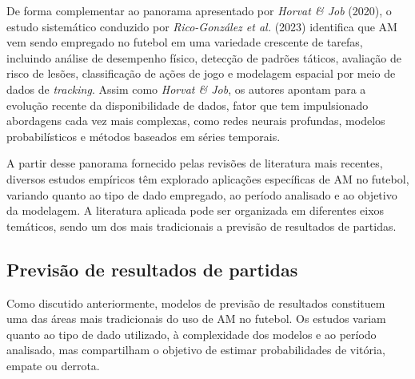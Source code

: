 De forma complementar ao panorama apresentado por \textit{Horvat \& Job} (2020), o estudo sistemático conduzido por \textit{Rico-González et al.} (2023) identifica que
AM vem sendo empregado no futebol em uma variedade crescente de tarefas, incluindo análise de desempenho físico, detecção de padrões táticos, avaliação de risco de
lesões, classificação de ações de jogo e modelagem espacial por meio de dados de \textit{tracking}. Assim como \textit{Horvat \& Job}, os autores apontam para a evolução
recente da disponibilidade de dados, fator que tem impulsionado abordagens cada vez mais complexas, como redes neurais profundas, modelos probabilísticos e métodos baseados
em séries temporais.

A partir desse panorama fornecido pelas revisões de literatura mais recentes, diversos estudos empíricos têm explorado aplicações específicas de AM no futebol, variando 
quanto ao tipo de dado empregado, ao período analisado e ao objetivo da modelagem. A literatura aplicada pode ser organizada em diferentes eixos temáticos, sendo um dos mais 
tradicionais a previsão de resultados de partidas.


\subsection{Previsão de resultados de partidas}

Como discutido anteriormente, modelos de previsão de resultados constituem uma das áreas mais tradicionais do uso de AM no futebol. Os estudos 
variam quanto ao tipo de dado utilizado, à complexidade dos modelos e ao período analisado, mas compartilham o objetivo de estimar probabilidades de vitória, 
empate ou derrota.


